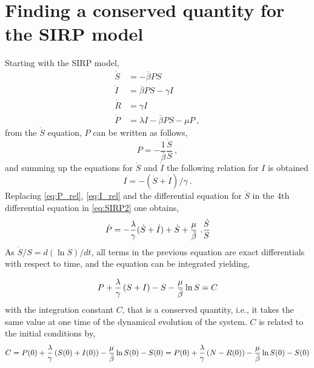 \section{Finding a conserved quantity for the SIRP model}
\label{app:P_exact}

Starting with the SIRP model,
\begin{equation}\label{eq:SIRP2}
    \begin{aligned}
        \dot{S} & =-\bar{\beta} P S                    \\
        \dot{I} & =\bar{\beta} P S-\gamma I            \\
        \dot{R} & =\gamma I                            \\
        \dot{P} & =\lambda I-\bar{\beta}P S -\mu P \ ,
    \end{aligned}
\end{equation}
from the $\dot{S}$ equation, $P$ can be written as follows,
\begin{equation}\label{eq:P_rel}
    P=-\frac{1}{\bar{\beta}}\frac{\dot{S}}{S} \ ,
\end{equation}
and summing up the equations for $\dot{S}$ and $\dot{I}$ the following
relation for $I$ is obtained
\begin{equation}\label{eq:I_rel}
    I=-(\dot{S}+\dot{I})/\gamma \ .
\end{equation}
Replacing \cref{eq:P_rel}, \cref{eq:I_rel} and the differential equation
for $\dot{S}$ in the $4$th differential equation in \cref{eq:SIRP2} one
obtains,
\begin{equation}
    \dot{P}=-{{\lambda}\over{\gamma}} (\dot{S}+\dot{I})+\dot{S}+
    {{\mu}\over{\bar{\beta}}}\ . {{\dot{S}}\over{S}}
\end{equation}
As $\dot{S}/S=d(\ln S)/dt$, all terms in the previous equation are exact
differentials with respect to time, and the equation can be integrated
yielding,

\begin{equation}
    P + \frac{\lambda}{\gamma}\left(S+I\right)-S-\frac{\mu}{\bar{\beta}}\ln S=C
    \label{eq:conservedquantity_nacras_I}
\end{equation}
with the integration constant $C$,
that is a conserved quantity, i.e., it takes the same value at one time of
the dynamical evolution of the system.
$C$ is related to the initial conditions by,
\begin{equation}
    C = P(0)+\frac{\lambda}{\gamma}\left(S(0)+I(0)\right) -
    \frac{\mu}{\bar{\beta}}\ln{S(0)} -
    S(0)=P(0)+\frac{\lambda}{\gamma}\left(N-R(0)\right) -
    \frac{\mu}{\bar{\beta}}\ln{S(0)} - S(0)
    \label{eq:C_constant}
\end{equation}

